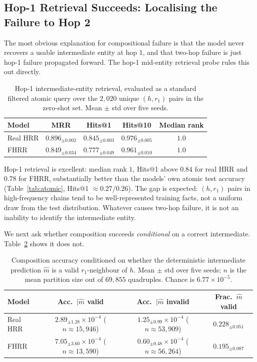 \documentclass[11pt]{article}
\theoremstyle{definition}
\begin{document}
\subsection{Hop-1 Retrieval Succeeds: Localising the Failure to Hop 2}
\label{sec:results-hop1}

The most obvious explanation for compositional failure is that the model never
recovers a usable intermediate entity at hop 1, and that two-hop failure is
just hop-1 failure propagated forward. The hop-1 mid-entity retrieval probe
rules this out directly.

\begin{table}[H]
\centering
\caption{Hop-1 intermediate-entity retrieval, evaluated as a standard filtered
atomic query over the $2{,}020$ unique $(h,r_1)$ pairs in the zero-shot set.
Mean $\pm$ std over five seeds.}
\label{tab:hop1}
\begin{tabular}{lcccc}
\toprule
Model & MRR & Hits@1 & Hits@10 & Median rank \\
\midrule
Real HRR & $0.896_{\pm 0.002}$ & $0.845_{\pm 0.003}$ & $0.976_{\pm 0.005}$ & $1.0$ \\
FHRR     & $0.849_{\pm 0.034}$ & $0.777_{\pm 0.049}$ & $0.961_{\pm 0.010}$ & $1.0$ \\
\bottomrule
\end{tabular}
\end{table}

Hop-1 retrieval is excellent: median rank $1$, Hits@1 above $0.84$ for real
HRR and $0.78$ for FHRR, substantially better than the models' own atomic
test accuracy (Table~\ref{tab:atomic}, Hits@1 $\approx 0.27$/$0.26$). The
gap is expected: $(h, r_1)$ pairs in high-frequency chains tend to be
well-represented training facts, not a uniform draw from the test distribution.
Whatever causes two-hop failure, it is not an inability to identify the
intermediate entity.

We next ask whether composition succeeds \emph{conditional} on a correct
intermediate. Table~\ref{tab:conditional} shows it does not.

\begin{table}[H]
\centering
\caption{Composition accuracy conditioned on whether the deterministic
intermediate prediction $\hat m$ is a valid $r_1$-neighbour of $h$. Mean
$\pm$ std over five seeds; $n$ is the mean partition size out of $69{,}855$
quadruples. Chance is $6.77\times10^{-5}$.}
\label{tab:conditional}
\begin{tabular}{lccc}
\toprule
Model & Acc.\ $\mid \hat m$ valid & Acc.\ $\mid \hat m$ invalid & Frac.\ $\hat m$ valid \\
\midrule
Real HRR & $2.89_{\pm 1.28}\times10^{-4}$ ($n{\approx}15{,}946$) & $1.25_{\pm 0.99}\times10^{-4}$ ($n{\approx}53{,}909$) & $0.228_{\pm 0.051}$ \\
FHRR     & $7.05_{\pm 3.60}\times10^{-4}$ ($n{\approx}13{,}590$) & $0.60_{\pm 0.48}\times10^{-4}$ ($n{\approx}56{,}264$) & $0.195_{\pm 0.087}$ \\
\bottomrule
\end{tabular}
\end{table}
\end{document}
